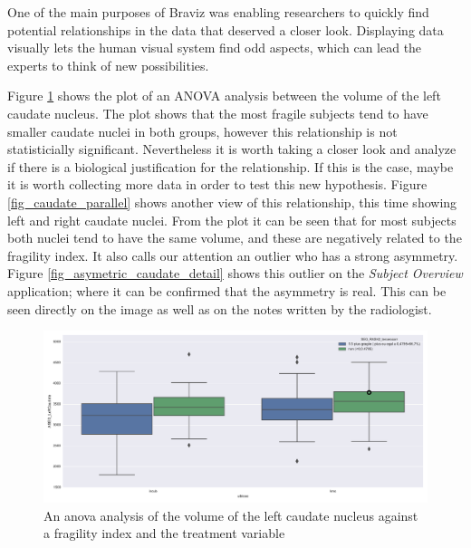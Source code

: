 One of the main purposes of Braviz was enabling researchers to quickly find potential relationships in the data that deserved a closer look. Displaying data visually lets the human visual system find odd aspects, which can lead the experts to think of new possibilities. 

Figure \ref{fig_anova_example} shows the plot of an ANOVA analysis between the volume of the left caudate nucleus. The plot shows that the most fragile subjects tend to have smaller caudate nuclei in both groups, however this relationship is not statisticially significant. Nevertheless it is worth taking a closer look and analyze if there is a biological justification for the relationship. If this is the case, maybe it is worth collecting more data in order to test this new hypothesis. Figure \ref{fig_caudate_parallel} shows another view of this relationship, this time showing left and right caudate nuclei. From the plot it can be seen that for most subjects both nuclei tend to have the same volume, and these are negatively related to the fragility index. It also calls our attention an outlier who has a strong asymmetry. Figure \ref{fig_asymetric_caudate_detail} shows this outlier on the \emph{Subject Overview} application; where it can be confirmed that the asymmetry is real. This can be seen directly on the image as well as on the notes written by the radiologist.


\begin{figure}
	\centering
		\includegraphics[width=\textwidth]{figures/kmc400/left_caudate_fragility_anova}
	\caption{An anova analysis of the volume of the left caudate nucleus against a fragility index and the treatment variable}
	\label{fig_anova_example}
\end{figure}


